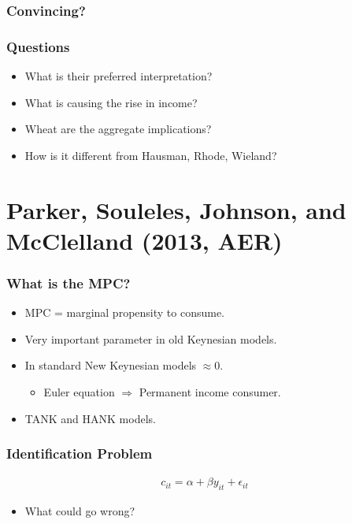 \documentclass[english,xcolor=svgnames]{beamer}
\begin{document}
\begin{frame}
\frametitle[alignment=center]{Convincing?}

\end{frame}

\begin{frame}
\frametitle[alignment=center]{Questions}
\begin{itemize}
	\item What is their preferred interpretation?
	\item What is causing the rise in income?
	\item Wheat are the aggregate implications?
	\item How is it different from Hausman, Rhode, Wieland?
\end{itemize}
\end{frame}



\section{Parker, Souleles, Johnson, and McClelland (2013, AER)}

\begin{frame}
\frametitle[alignment=center]{What is the MPC?}
\begin{itemize}
	\item MPC = marginal propensity to consume.
	\item Very important parameter in old Keynesian models.
	\item In standard New Keynesian models $\approx 0$.
	\begin{itemize}
		\item Euler equation $\Rightarrow$ Permanent income consumer.
	\end{itemize}
	\item TANK and HANK models.
\end{itemize}
\end{frame}

\begin{frame}
\frametitle[alignment=center]{Identification Problem}
\begin{align*}
	c_{it}  = \alpha + \beta y_{it} + \epsilon_{it}
\end{align*}
\begin{itemize}
	\item What could go wrong?
\end{itemize}
\end{frame}
\end{document}
